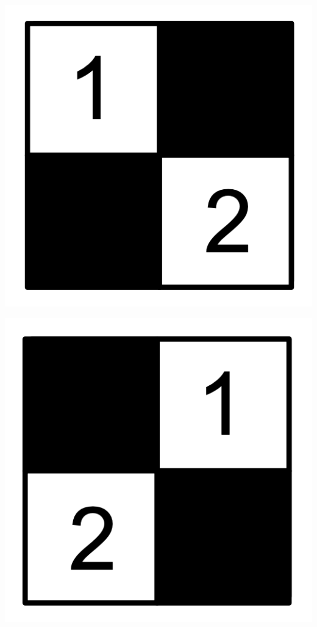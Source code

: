 \documentclass{book}
\theoremstyle{definition}
\begin{document}
\begin{center}
\includegraphics[scale=1]{r2.png}
\end{center}

\begin{center}
\includegraphics[scale=1]{r3.png}
\end{center}
\end{document}
